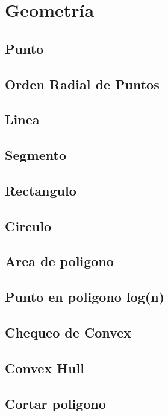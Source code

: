 
\section{Geometr\'ia}

\subsection{Punto}


\subsection{Orden Radial de Puntos}


\subsection{Linea}


\subsection{Segmento}


\subsection{Rectangulo}


\subsection{Circulo}


\subsection{Area de poligono}


\subsection{Punto en poligono log(n)}


\subsection{Chequeo de Convex}


\subsection{Convex Hull}


\subsection{Cortar poligono}

